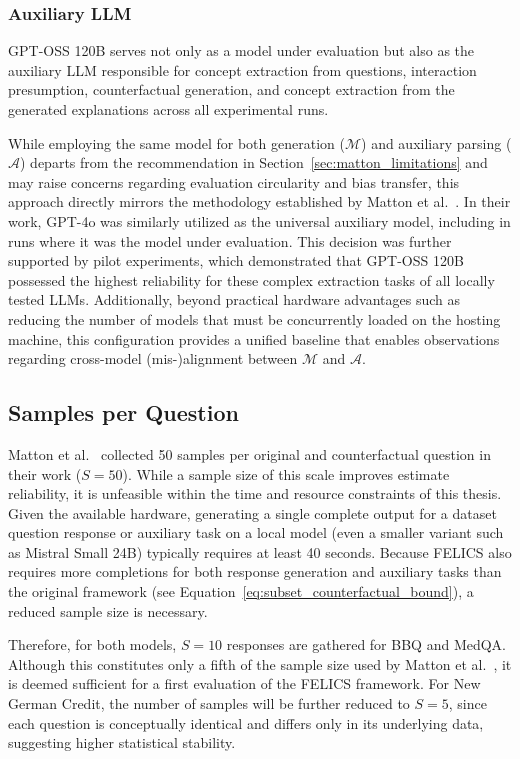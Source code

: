\subsubsection{Auxiliary LLM}
GPT-OSS 120B serves not only as a model under evaluation but also as the auxiliary LLM responsible for concept extraction from questions, interaction presumption, counterfactual generation, and concept extraction from the generated explanations across all experimental runs.

While employing the same model for both generation ($\mathcal{M}$) and auxiliary parsing ($\mathcal{A}$) departs from the recommendation in Section~\ref{sec:matton_limitations} and may raise concerns regarding evaluation circularity and bias transfer, this approach directly mirrors the methodology established by Matton et al.~\cite{mattonWalkTalkMeasuring2024}. In their work, GPT-4o was similarly utilized as the universal auxiliary model, including in runs where it was the model under evaluation. This decision was further supported by pilot experiments, which demonstrated that GPT-OSS 120B possessed the highest reliability for these complex extraction tasks of all locally tested LLMs. Additionally, beyond practical hardware advantages such as reducing the number of models that must be concurrently loaded on the hosting machine, this configuration provides a unified baseline that enables observations regarding cross-model (mis-)alignment between $\mathcal{M}$ and $\mathcal{A}$.

\subsection{Samples per Question}
Matton et al.~\cite{mattonWalkTalkMeasuring2024} collected 50 samples per original and counterfactual question in their work ($S = 50$). While a sample size of this scale improves estimate reliability, it is unfeasible within the time and resource constraints of this thesis. Given the available hardware, generating a single complete output for a dataset question response or auxiliary task on a local model (even a smaller variant such as Mistral Small 24B) typically requires at least 40 seconds. Because FELICS also requires more completions for both response generation and auxiliary tasks than the original framework (see Equation~\ref{eq:subset_counterfactual_bound}), a reduced sample size is necessary.

Therefore, for both models, $S=10$ responses are gathered for BBQ and MedQA. Although this constitutes only a fifth of the sample size used by Matton et al.~\cite{mattonWalkTalkMeasuring2024}, it is deemed sufficient for a first evaluation of the FELICS framework. For New German Credit, the number of samples will be further reduced to $S=5$, since each question is conceptually identical and differs only in its underlying data, suggesting higher statistical stability.

